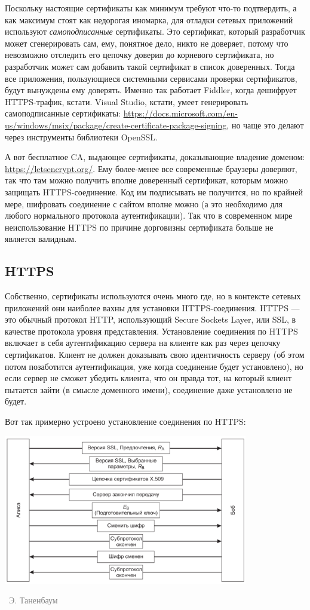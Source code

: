 \documentclass[a5paper]{article}
\newcommand{\attribution}[1] {
\vspace{-5mm}\begin{flushright}\begin{scriptsize}\textcolor{gray}{\textcopyright\, #1}\end{scriptsize}\end{flushright}
}
\begin{document}
Поскольку настоящие сертификаты как минимум требуют что-то подтвердить, а как максимум стоят как недорогая иномарка, для отладки сетевых приложений используют \textit{самоподписанные} сертификаты. Это сертификат, который разработчик может сгенерировать сам, ему, понятное дело, никто не доверяет, потому что невозможно отследить его цепочку доверия до корневого сертификата, но разработчик может сам добавить такой сертификат в список доверенных. Тогда все приложения, пользующиеся системными сервисами проверки сертификатов, будут вынуждены ему доверять. Именно так работает Fiddler, когда дешифрует HTTPS-трафик, кстати. Visual Studio, кстати, умеет генерировать самоподписанные сертификаты: \url{https://docs.microsoft.com/en-us/windows/msix/package/create-certificate-package-signing}, но чаще это делают через инструменты библиотеки OpenSSL. 

А вот бесплатное CA, выдающее сертификаты, доказывающие владение доменом: \url{https://letsencrypt.org/}. Ему более-менее все современные браузеры доверяют, так что там можно получить вполне доверенный сертификат, которым можно защищать HTTPS-соединение. Код им подписывать не получится, но по крайней мере, шифровать соединение с сайтом вполне можно (а это необходимо для любого нормального протокола аутентификации). Так что в современном мире неиспользование HTTPS по причине дорговизны сертификата больше не является валидным.

\subsection{HTTPS}

Собственно, сертификаты используются очень много где, но в контексте сетевых приложений они наиболее вахны для установки HTTPS-соединения. HTTPS --- это обычный протокол HTTP, использующий Secure Sockets Layer, или SSL, в качестве протокола уровня представления. Установление соединения по HTTPS включает в себя аутентификацию сервера на клиенте как раз через цепочку сертификатов. Клиент не должен доказывать свою идентичность серверу (об этом потом позаботится аутентификация, уже когда соединение будет установлено), но если сервер не сможет убедить клиента, что он правда тот, на который клиент пытается зайти (в смысле доменного имени), соединение даже установлено не будет.

Вот так примерно устроено установление соединения по HTTPS:

\begin{center}
    \includegraphics[width=0.8\textwidth]{ssl.png}
    \attribution{Э. Таненбаум}
\end{center}
\end{document}
